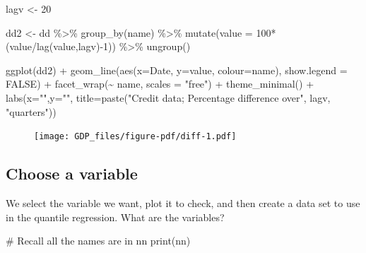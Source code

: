 \documentclass[
  letterpaper,
]{book}
\newenvironment{Shaded}{\begin{snugshade}}{\end{snugshade}}
\newcommand{\AttributeTok}[1]{\textcolor[rgb]{0.40,0.45,0.13}{#1}}
\newcommand{\CommentTok}[1]{\textcolor[rgb]{0.37,0.37,0.37}{#1}}
\newcommand{\ConstantTok}[1]{\textcolor[rgb]{0.56,0.35,0.01}{#1}}
\newcommand{\DecValTok}[1]{\textcolor[rgb]{0.68,0.00,0.00}{#1}}
\newcommand{\FunctionTok}[1]{\textcolor[rgb]{0.28,0.35,0.67}{#1}}
\newcommand{\NormalTok}[1]{\textcolor[rgb]{0.00,0.23,0.31}{#1}}
\newcommand{\OtherTok}[1]{\textcolor[rgb]{0.00,0.23,0.31}{#1}}
\newcommand{\SpecialCharTok}[1]{\textcolor[rgb]{0.37,0.37,0.37}{#1}}
\newcommand{\StringTok}[1]{\textcolor[rgb]{0.13,0.47,0.30}{#1}}
\begin{document}
\begin{Shaded}
\begin{Highlighting}[]
\NormalTok{lagv }\OtherTok{\textless{}{-}} \DecValTok{20}

\NormalTok{dd2 }\OtherTok{\textless{}{-}}\NormalTok{ dd }\SpecialCharTok{\%\textgreater{}\%} 
  \FunctionTok{group\_by}\NormalTok{(name) }\SpecialCharTok{\%\textgreater{}\%} 
  \FunctionTok{mutate}\NormalTok{(}\AttributeTok{value =} \DecValTok{100}\SpecialCharTok{*}\NormalTok{(value}\SpecialCharTok{/}\FunctionTok{lag}\NormalTok{(value,lagv)}\SpecialCharTok{{-}}\DecValTok{1}\NormalTok{)) }\SpecialCharTok{\%\textgreater{}\%} 
  \FunctionTok{ungroup}\NormalTok{() }

\FunctionTok{ggplot}\NormalTok{(dd2) }\SpecialCharTok{+} 
  \FunctionTok{geom\_line}\NormalTok{(}\FunctionTok{aes}\NormalTok{(}\AttributeTok{x=}\NormalTok{Date, }\AttributeTok{y=}\NormalTok{value, }\AttributeTok{colour=}\NormalTok{name), }\AttributeTok{show.legend =} \ConstantTok{FALSE}\NormalTok{) }\SpecialCharTok{+}
  \FunctionTok{facet\_wrap}\NormalTok{(}\SpecialCharTok{\textasciitilde{}}\NormalTok{ name, }\AttributeTok{scales =} \StringTok{"free"}\NormalTok{) }\SpecialCharTok{+} 
  \FunctionTok{theme\_minimal}\NormalTok{() }\SpecialCharTok{+}
  \FunctionTok{labs}\NormalTok{(}\AttributeTok{x=}\StringTok{""}\NormalTok{,}\AttributeTok{y=}\StringTok{""}\NormalTok{, }\AttributeTok{title=}\FunctionTok{paste}\NormalTok{(}\StringTok{"Credit data; Percentage difference over"}\NormalTok{, lagv, }\StringTok{"quarters"}\NormalTok{))}
\end{Highlighting}
\end{Shaded}

\begin{figure}[H]

{\centering \texttt{[image: GDP\_files/figure-pdf/diff-1.pdf]}

}

\end{figure}

\hypertarget{choose-a-variable}{%
\subsection{Choose a variable}\label{choose-a-variable}}

We select the variable we want, plot it to check, and then create a data
set to use in the quantile regression. What are the variables?

\begin{Shaded}
\begin{Highlighting}[]
\CommentTok{\# Recall all the names are in nn}
\FunctionTok{print}\NormalTok{(nn)}
\end{Highlighting}
\end{Shaded}
\end{document}
